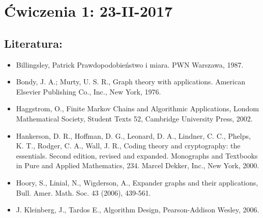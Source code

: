 \section{Ćwiczenia 1: 23-II-2017}
\subsection{Literatura:}
\begin{itemize}
\item Billingsley, Patrick Prawdopodobieństwo i miara. PWN Warszawa, 1987.
\item Bondy, J. A.; Murty, U. S. R., Graph theory with applications. American Elsevier Publishing Co., Inc., New York, 1976.
\item Haggstrom, O., Finite Markov Chains and Algorithmic Applications, Londom Mathematical Society, Student Texts 52, Cambridge University Press, 2002.
\item Hankerson, D. R., Hoffman, D. G., Leonard, D. A., Lindner, C. C., Phelps, K. T., Rodger, C. A., Wall, J. R., Coding theory and cryptography: the essentials. Second edition, revised and expanded. Monographs and Textbooks in Pure and Applied Mathematics, 234. Marcel Dekker, Inc., New York, 2000.
\item Hoory, S., Linial, N., Wigderson, A., Expander graphs and their applications, Bull. Amer. Math. Soc. 43 (2006), 439-561.
\item J. Kleinberg, J., Tardos E., Algorithm Design, Pearson-Addison Wesley, 2006.
\end{itemize}

